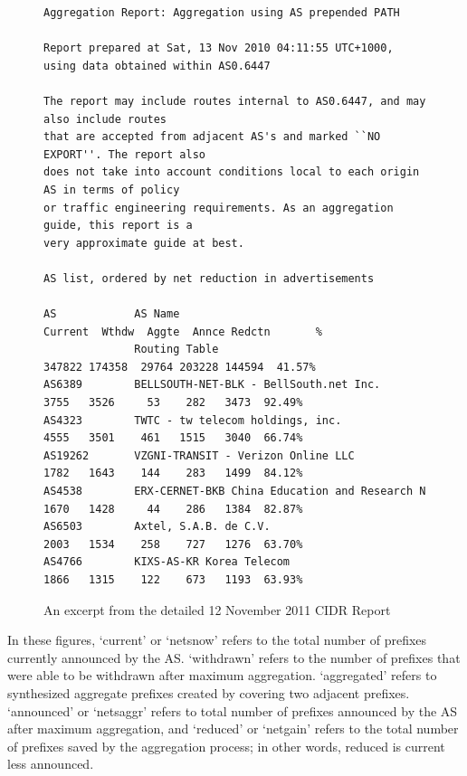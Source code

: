 \begin{figure}
\begin{lstlisting}[frame=trlb]
Aggregation Report: Aggregation using AS prepended PATH

Report prepared at Sat, 13 Nov 2010 04:11:55 UTC+1000, using data obtained within AS0.6447

The report may include routes internal to AS0.6447, and may also include routes
that are accepted from adjacent AS's and marked ``NO EXPORT''. The report also 
does not take into account conditions local to each origin AS in terms of policy
or traffic engineering requirements. As an aggregation guide, this report is a 
very approximate guide at best. 

AS list, ordered by net reduction in advertisements

AS            AS Name                                      Current  Wthdw  Aggte  Annce Redctn       %
              Routing Table                                 347822 174358  29764 203228 144594  41.57%
AS6389        BELLSOUTH-NET-BLK - BellSouth.net Inc.          3755   3526     53    282   3473  92.49%
AS4323        TWTC - tw telecom holdings, inc.                4555   3501    461   1515   3040  66.74%
AS19262       VZGNI-TRANSIT - Verizon Online LLC              1782   1643    144    283   1499  84.12%
AS4538        ERX-CERNET-BKB China Education and Research N   1670   1428     44    286   1384  82.87%
AS6503        Axtel, S.A.B. de C.V.                           2003   1534    258    727   1276  63.70%
AS4766        KIXS-AS-KR Korea Telecom                        1866   1315    122    673   1193  63.93%
\end{lstlisting}
\caption{An excerpt from the detailed 12 November 2011 CIDR Report}
\label{fig:ex_cidr_report_detail}
\end{figure}

In these figures, `current' or `netsnow' refers to the total number of prefixes currently announced by the AS. `withdrawn' refers to the number of prefixes that were able to be withdrawn after maximum aggregation. `aggregated' refers to synthesized aggregate prefixes created by covering two adjacent prefixes. `announced' or `netsaggr' refers to total number of prefixes announced by the AS after maximum aggregation, and `reduced' or `netgain' refers to the total number of prefixes saved by the aggregation process; in other words, reduced is current less announced.


